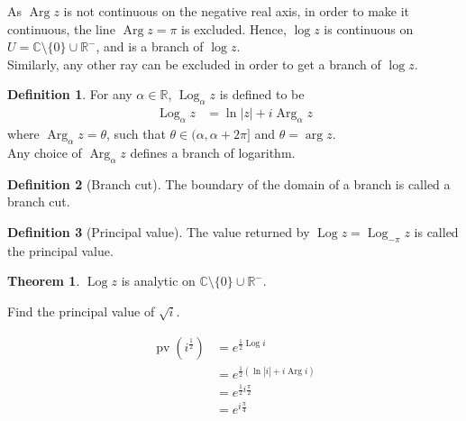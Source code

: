 \documentclass[titlepage, fleqn, a4paper, 12pt, twoside]{article}
\theoremstyle{definition}
\newtheorem{definition}{Definition}
\theoremstyle{theorem}
\newtheorem{theorem}{Theorem}
\DeclareMathOperator{\Arg}{Arg}
\DeclareMathOperator{\Log}{Log}
\DeclareMathOperator{\pv}{pv}
\begin{document}
As $\Arg z$ is not continuous on the negative real axis, in order to make it continuous, the line $\Arg z = \pi$ is excluded.
Hence, $\log z$ is continuous on $U = \mathbb{C} \setminus \{0\} \cup \mathbb{R}^-$, and is a branch of $\log z$.\\
Similarly, any other ray can be excluded in order to get a branch of $\log z$.\\

\begin{definition}
	For any $\alpha \in \mathbb{R}$, $\Log_{\alpha} z$ is defined to be
	\begin{align*}
		\Log_{\alpha} z & = \ln |z| + i \Arg_{\alpha} z
	\end{align*}
	where $\Arg_{\alpha} z = \theta$, such that $\theta \in (\alpha , \alpha + 2 \pi]$ and $\theta = \arg z$.\\
	Any choice of $\Arg_{\alpha} z$ defines a branch of logarithm.
\end{definition}

\begin{definition}[Branch cut]
	The boundary of the domain of a branch is called a branch cut.
\end{definition}

\begin{definition}[Principal value]
	The value returned by $\Log z = \Log_{-\pi} z$ is called the principal value.
\end{definition}

\begin{theorem}
	$\Log z$ is analytic on $\mathbb{C} \setminus \{0\} \cup \mathbb{R}^-$.
\end{theorem}

\begin{question}
	Find the principal value of $\sqrt{i}$.
\end{question}

\begin{solution}
	\begin{align*}
		\pv\left( i^{\frac{1}{2}} \right) & = e^{\frac{1}{2} \Log i}                           \\
                                                  & = e^{\frac{1}{2} \left( \ln|i| + i \Arg i \right)} \\
                                                  & = e^{\frac{1}{2} i \frac{\pi}{2}}                  \\
                                                  & = e^{i \frac{\pi}{4}}
	\end{align*}
\end{solution}
\end{document}
